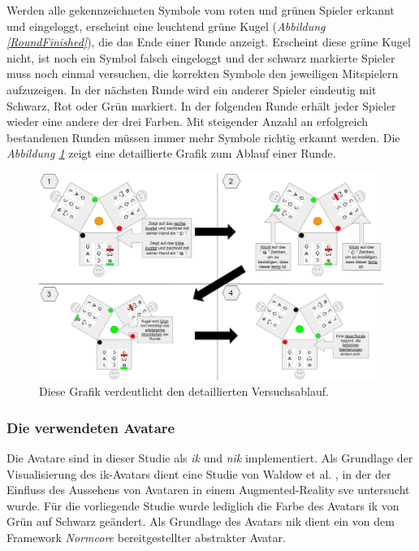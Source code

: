 \documentclass[a4paper,11pt]{article}%
\renewcommand{\\}{\vspace*{0.5\baselineskip} \newline}
\begin{document}
Werden alle gekennzeichneten Symbole vom roten und grünen Spieler erkannt und eingeloggt, erscheint eine leuchtend grüne Kugel (\textit{Abbildung \ref{RoundFinished}}), die das Ende einer Runde anzeigt. Erscheint diese grüne Kugel nicht, ist noch ein Symbol falsch eingeloggt und der schwarz markierte Spieler muss noch einmal versuchen, die korrekten Symbole den jeweiligen Mitspielern aufzuzeigen. 
In der nächsten Runde wird ein anderer Spieler eindeutig mit Schwarz, Rot oder Grün markiert.
In der folgenden Runde erhält jeder Spieler wieder eine andere der drei Farben. Mit steigender Anzahl an erfolgreich bestandenen Runden müssen immer mehr Symbole richtig erkannt werden. 
Die \textit{Abbildung \ref{DetaillierterVersuchsablauf}} zeigt eine detaillierte Grafik zum Ablauf einer Runde.

	\begin{figure}[h]
		\begin{footnotesize}
		\centering
			\includegraphics[scale=0.30]{Abbildungen/DetaillierterVersuchsablauf.JPG}		
			\caption[Darstellung des Versuchsablaufs]{Diese Grafik verdeutlicht den detaillierten Versuchsablauf.}
			\label{DetaillierterVersuchsablauf}
		\end{footnotesize}
	\end{figure}

	\subsubsection{Die verwendeten Avatare}
\label{IKNIK}
Die Avatare sind in dieser Studie als \textit{\ac{ik}} und \textit{\ac{nik}} implementiert. Als Grundlage der Visualisierung des \ac{ik}-Avatars dient eine Studie von Waldow et al. \citep{waldow2019investigating}, in der der Einfluss des Aussehens von Avataren in einem Augmented-Reality \ac{sve} untersucht wurde. Für die vorliegende Studie wurde lediglich die Farbe des Avatars \ac{ik} von Grün auf Schwarz geändert. 
Als Grundlage des Avatars \ac{nik} dient ein von dem Framework \textit{Normcore} bereitgestellter abstrakter Avatar.
\end{document}
